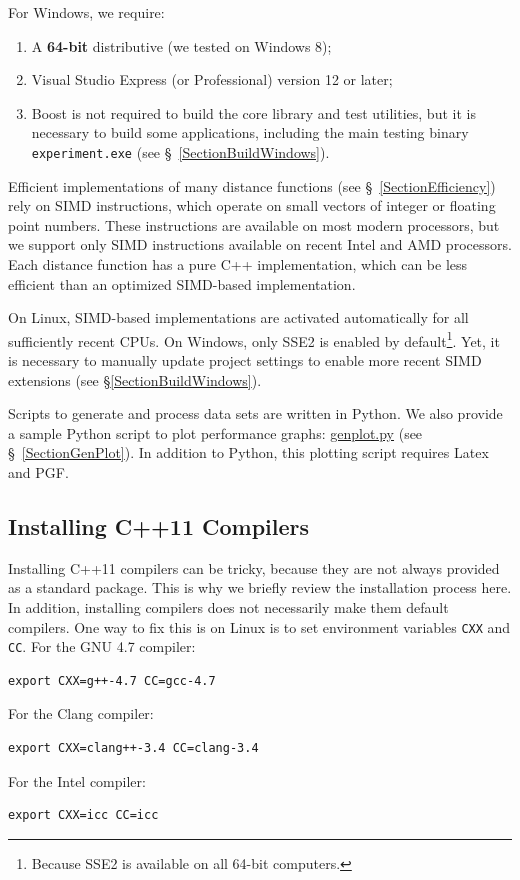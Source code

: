 \documentclass[runningheads,a4paper]{llncs}
\newcommand{\replocfile}{https://github.com/searchivarius/NonMetricSpaceLib/blob/pserv/}
\newcommand{\ttt}[1]{\texttt{#1}}
\begin{document}
{For Windows, we require:
\begin{enumerate}
\item A \textbf{64-bit} distributive (we tested on Windows 8); 
\item Visual Studio Express (or Professional) version 12 or later;
\item Boost is not required to build the core library and test utilities, 
but it is necessary to build some applications,
including the main testing binary \ttt{experiment.exe} (see \S~\ref{SectionBuildWindows}). 
\end{enumerate}

Efficient implementations of many distance functions (see \S~\ref{SectionEfficiency})
rely on SIMD instructions,
which operate on small  vectors of integer or floating point numbers. 
These instructions are available on most modern processors,
but we support only SIMD instructions available on recent Intel and AMD processors.   
Each distance function has a pure C++ implementation,
which can be less efficient than an optimized SIMD-based implementation.

On Linux, SIMD-based implementations are activated automatically 
for all sufficiently recent CPUs. 
On Windows, only SSE2 is enabled by default\footnote{Because SSE2 is available on all 64-bit computers.}. 
Yet, it is necessary to manually update project settings 
to enable more recent SIMD extensions (see \S\ref{SectionBuildWindows}).

Scripts to generate and process data sets are written in Python.
We also provide a sample Python script to plot performance graphs: \href{\replocfile sample_scripts/sample_scripts/genplot.py}{genplot.py} (see \S~\ref{SectionGenPlot}).
In addition to Python, this plotting script requires Latex and PGF. 

\subsection{Installing C++11 Compilers}
Installing C++11 compilers can be tricky, 
because they are not always provided as a standard package.
This is why we briefly review the installation process here. 
In addition, installing compilers does 
not necessarily make them default compilers.
One way to fix this is on Linux is to set environment variables \ttt{CXX} and \ttt{CC}.
For the GNU 4.7 compiler:
\begin{verbatim}
export CXX=g++-4.7 CC=gcc-4.7 
\end{verbatim}
For the Clang compiler:
\begin{verbatim}
export CXX=clang++-3.4 CC=clang-3.4
\end{verbatim}
For the Intel compiler:
\begin{verbatim}
export CXX=icc CC=icc 
\end{verbatim}

}
\end{document}
